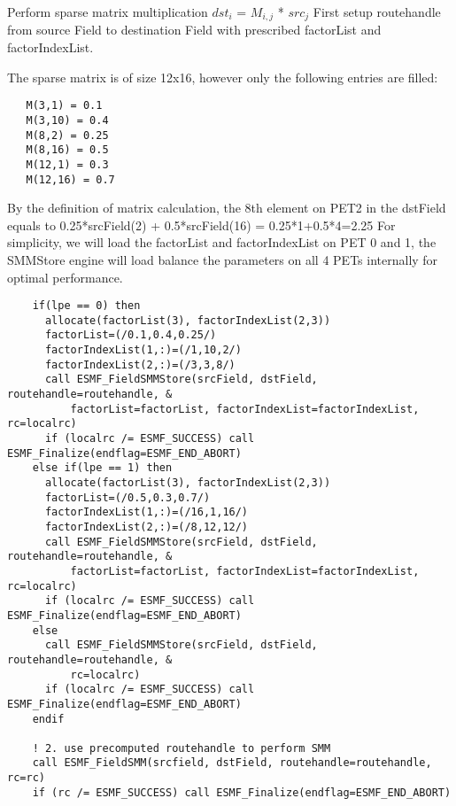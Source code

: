 
   Perform sparse matrix multiplication $dst_i$ = $M_{i,j}$ * $src_j$
   First setup routehandle from source Field to destination Field
   with prescribed factorList and factorIndexList.
  
   The sparse matrix is of size 12x16, however only the following entries
   are filled:
   \begin{verbatim}
   M(3,1) = 0.1
   M(3,10) = 0.4
   M(8,2) = 0.25
   M(8,16) = 0.5
   M(12,1) = 0.3
   M(12,16) = 0.7
   \end{verbatim}
  
   By the definition of matrix calculation, the 8th element on PET2 in the
   dstField equals to 0.25*srcField(2) + 0.5*srcField(16) = 0.25*1+0.5*4=2.25
   For simplicity, we will load the factorList and factorIndexList on
   PET 0 and 1, the SMMStore engine will load balance the parameters on all 4
   PETs internally for optimal performance. 

 \begin{verbatim}
    if(lpe == 0) then
      allocate(factorList(3), factorIndexList(2,3))
      factorList=(/0.1,0.4,0.25/)
      factorIndexList(1,:)=(/1,10,2/)
      factorIndexList(2,:)=(/3,3,8/)
      call ESMF_FieldSMMStore(srcField, dstField, routehandle=routehandle, &
          factorList=factorList, factorIndexList=factorIndexList, rc=localrc)
      if (localrc /= ESMF_SUCCESS) call ESMF_Finalize(endflag=ESMF_END_ABORT)
    else if(lpe == 1) then
      allocate(factorList(3), factorIndexList(2,3))
      factorList=(/0.5,0.3,0.7/)
      factorIndexList(1,:)=(/16,1,16/)
      factorIndexList(2,:)=(/8,12,12/)
      call ESMF_FieldSMMStore(srcField, dstField, routehandle=routehandle, &
          factorList=factorList, factorIndexList=factorIndexList, rc=localrc)
      if (localrc /= ESMF_SUCCESS) call ESMF_Finalize(endflag=ESMF_END_ABORT)
    else
      call ESMF_FieldSMMStore(srcField, dstField, routehandle=routehandle, &
          rc=localrc)
      if (localrc /= ESMF_SUCCESS) call ESMF_Finalize(endflag=ESMF_END_ABORT)
    endif

    ! 2. use precomputed routehandle to perform SMM
    call ESMF_FieldSMM(srcfield, dstField, routehandle=routehandle, rc=rc)
    if (rc /= ESMF_SUCCESS) call ESMF_Finalize(endflag=ESMF_END_ABORT)
 
\end{verbatim}

\setlength{\parskip}{\oldparskip}
\setlength{\parindent}{\oldparindent}
\setlength{\baselineskip}{\oldbaselineskip}
